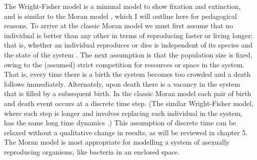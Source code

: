 The Wright-Fisher model is a minimal model to show fixation and extinction, and is similar to the Moran model \cite{Moran1962}, which I will outline here for pedagogical reasons. 
To arrive at the classic Moran model we must first assume that no individual is better than any other in terms of reproducing faster or living longer; that is, whether an individual reproduces or dies is independent of its species and the state of the system \cite{Moran1962}. %
The next assumption is that the population size is fixed, owing to the (assumed) strict competition for resources or space in the system. 
That is, every time there is a birth the system becomes too crowded and a death follows immediately. 
Alternately, upon death there is a vacancy in the system that is filled by a subsequent birth.
In the classic Moran model each pair of birth and death event occurs at a discrete time step. 
(The similar Wright-Fisher model, where each step is longer and involves replacing each individual in the system, has the same long time dynamics \cite{Blythe2007}.) 
This assumption of discrete time can be relaxed without a qualitative change in results, as will be reviewed in chapter 5. 
The Moran model is most appropriate for modelling a system of asexually reproducing organisms, like bacteria in an enclosed space. %

